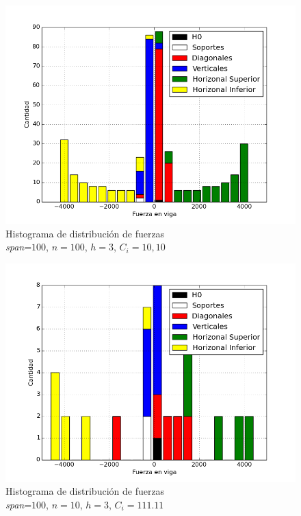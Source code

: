 \begin{figure}[h!]
\begin{center}
\includegraphics[scale=0.5]{archivos/graficos/hist_n100_C1000.png}
\caption{\label{fig:hist_n100_C1000}Histograma de distribución de fuerzas\\
\textit{span}=$100$, $n=100$, $h=3$, $C_i=10,10$}
\end{center}
\end{figure}

\begin{figure}[h!]
\begin{center}
\includegraphics[scale=0.5]{archivos/graficos/hist_n10_C1000.png}
\caption{\label{fig:hist_n10_C1000}Histograma de distribución de fuerzas\\
\textit{span}=$100$, $n=10$, $h=3$, $C_i=111.11$}
\end{center}
\end{figure}

